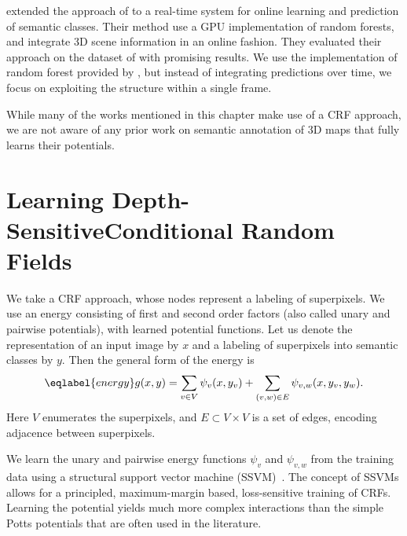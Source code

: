 \citet{stueckler2013} extended the approach of \citet{stuckler2012semantic} to
a real-time system for online learning and prediction of semantic classes.
Their method use a GPU implementation of random forests, and integrate 3D scene
information in an online fashion. They evaluated their approach on the dataset
of \citet{SilbermanECCV12} with promising results.  We use the implementation
of random forest provided by \citet{stueckler2013}, but instead of integrating
predictions over time, we focus on exploiting the structure within a single
frame.

While many of the works mentioned in this chapter make use of a CRF
approach, we are not aware of any prior work on semantic annotation of 3D maps
that fully learns their potentials.


\section[Learning Depth-Sensitive Conditional Random Fields]{Learning Depth-Sensitive\linebreak Conditional Random Fields}
We take a CRF approach, whose nodes represent a labeling of
superpixels.  We use an energy consisting of first and second order factors
(also called unary and pairwise potentials), with learned potential functions.
Let us denote the representation of an input image by $x$ and a labeling of
superpixels into semantic classes by $y$.  Then the general form of the energy is
\begin{equation}\eqlabel{energy}
    g(x, y) = \sum_{v \in V} \psi_v(x, y_v) + \sum_{(v, w) \in E} \psi_{v,w}(x, y_{v}, y_{w}).
\end{equation}
Here $V$ enumerates the superpixels, and $E\subset V \times V$ is a set of
edges, encoding adjacence between superpixels.

We learn the unary and pairwise energy functions $\psi_v$ and $\psi_{v, w}$ from the training data
using a structural support vector machine (SSVM)~\citep{joachims2009cutting}. 
The concept of SSVMs allows for a principled,
maximum-margin based, loss-sensitive training of CRFs. Learning the potential yields much
more complex interactions than the simple Potts potentials that are often used in the literature.

